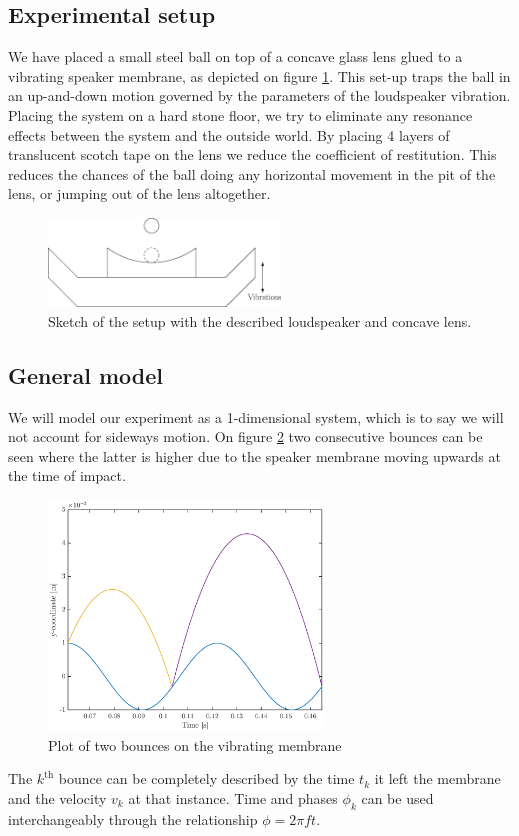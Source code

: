 \documentclass[12pt,oneside,a4paper]{article}
\numberwithin{equation}{section}
\begin{document}
{{{{\subsection{Experimental setup}
We have placed a small steel ball on top of a concave glass lens glued to a vibrating speaker membrane, as depicted on figure \ref{sketch}. This set-up traps the ball in an up-and-down motion governed by the parameters of the loudspeaker vibration. Placing the system on a hard stone floor, we try to eliminate any resonance effects between the system and the outside world. By placing 4 layers of translucent scotch tape on the lens we reduce the coefficient of restitution. This reduces the chances of the ball doing any horizontal movement in the pit of the lens, or jumping out of the lens altogether. 
\begin{figure}[h]
	\centering
	\includegraphics[width=0.55\textwidth]{speaker2}
	\caption{Sketch of the setup with the described loudspeaker and concave lens.}
	\label{sketch}
\end{figure}
\subsection{General model}
We will model our experiment as a 1-dimensional system, which is to say we will not 
account for sideways motion. On figure \ref{bounces} two consecutive bounces 
can be seen where the latter is higher due to the speaker membrane moving upwards at the 
time of impact.
\begin{figure}[ht]
	\centering
	\includegraphics[width=0.65\textwidth]{Figures/bounceplot.eps}
	\caption{Plot of two bounces on the vibrating membrane}
	\label{bounces}
\end{figure}
The $k^{\text{th}}$ bounce can be completely described by the time $t_k$ it left the membrane and the velocity $v_k$ at that instance. Time and phases $\phi_k$ can be used interchangeably through the relationship $\phi=2\pi f t$.

}}}}
\end{document}
